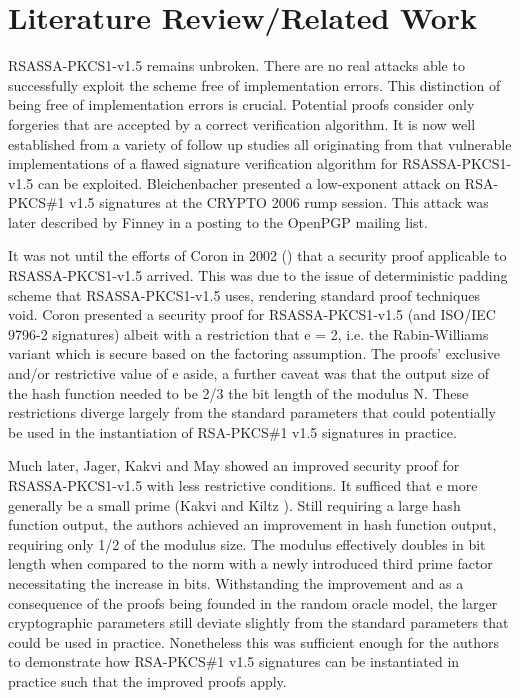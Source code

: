 \documentclass[]{final_report}
\theoremstyle{definition}
\begin{document}
\chapter{Literature Review/Related Work}
RSASSA-PKCS1-v1.5 remains unbroken. There are no real attacks able to successfully exploit the scheme free of implementation errors. This distinction of being free of implementation errors is crucial. Potential proofs consider only forgeries that are accepted by a correct verification algorithm. It is now well established from a variety of follow up studies all originating from \cite{bleichenbacher1998chosen} that vulnerable implementations of a flawed signature verification algorithm for RSASSA-PKCS1-v1.5 can be exploited. Bleichenbacher presented a low-exponent attack on RSA-PKCS\#1 v1.5 signatures at the CRYPTO 2006 rump session. This attack was later described by Finney \cite{finney2006bleichenbacher} in a posting to the OpenPGP mailing list. 

It was not until the efforts of Coron in 2002 (\cite{coron2002security}) that a security proof applicable to RSASSA-PKCS1-v1.5 arrived. This was due to the issue of deterministic padding scheme that RSASSA-PKCS1-v1.5 uses, rendering standard proof techniques void. Coron presented a security proof for RSASSA-PKCS1-v1.5 (and ISO/IEC 9796-2 signatures) albeit with a restriction that e = 2, i.e. the Rabin-Williams variant \cite{coron2002security} which is secure based on the factoring assumption. 
The proofs' exclusive and/or restrictive value of e aside, a further caveat was that the output size of the hash function needed to be 2/3 the bit length of the modulus N. These restrictions diverge largely from the standard parameters that could potentially be used in the instantiation of RSA-PKCS\#1 v1.5 signatures in practice. 

Much later, Jager, Kakvi and May \cite{jager2018security} showed an improved security proof for RSASSA-PKCS1-v1.5 with less restrictive conditions.
It sufficed that e more generally be a small prime (Kakvi and Kiltz \cite{kakvi2018optimal}). Still requiring a large hash function output, the authors achieved an improvement in hash function output, requiring only 1/2 of the modulus size. The modulus effectively doubles in bit length when compared to the norm with a newly introduced third prime factor necessitating the increase in bits.
Withstanding the improvement and as a consequence of the proofs being founded in the random oracle model, the larger cryptographic parameters still deviate slightly from the standard parameters that could be used in practice. Nonetheless this was sufficient enough for the authors to demonstrate how RSA-PKCS\#1 v1.5 signatures can be instantiated in practice such that the improved proofs apply. 
\end{document}
